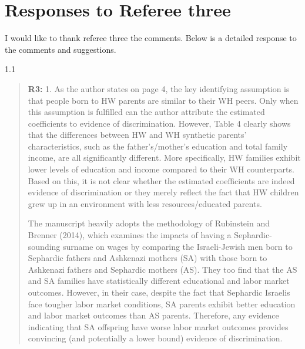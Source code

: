 \documentclass[12pt,english]{article}
\newcommand{\rrquote}{1.1}
\begin{document}
    \clearpage
    \pagebreak

    \section{Responses to Referee three}
    I would like to thank referee three the comments. Below is a detailed response to the comments and suggestions.

    \begin{spacing}{\rrquote}
        \begin{quotation}
        \textbf{R3: } 1. As the author states on page 4, the key identifying assumption is that people born to HW parents are similar to their WH peers. Only when this assumption is fulfilled can the author attribute the estimated coefficients to evidence of discrimination. However, Table 4 clearly shows that the differences between HW and WH synthetic parents’ characteristics, such as the father’s/mother’s education and total family income, are all significantly different. More specifically, HW families exhibit lower levels of education and income compared to their WH counterparts. Based on this, it is not clear whether the estimated coefficients are indeed evidence of discrimination or they merely reflect the fact that HW children grew up in an environment with less resources/educated parents.

        The manuscript heavily adopts the methodology of Rubinstein and Brenner (2014), which examines the impacts of having a Sephardic-sounding surname on wages by comparing the Israeli-Jewish men born to Sephardic fathers and Ashkenazi mothers (SA) with those born to Ashkenazi fathers and Sephardic mothers (AS). They too find that the AS and SA families have statistically different educational and labor market outcomes. However, in their case, despite the fact that Sephardic Israelis face tougher labor market conditions, SA parents exhibit better education and labor market outcomes than AS parents. Therefore, any evidence indicating that SA offspring have worse labor market outcomes provides convincing (and potentially a lower bound) evidence of discrimination.

        \end{quotation}
        \end{spacing}
        
\end{document}
